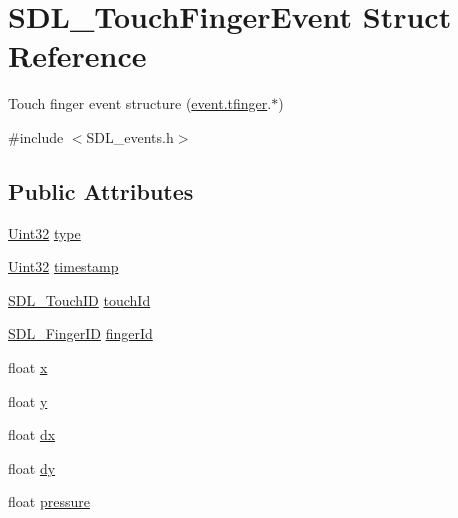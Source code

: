 \hypertarget{struct_s_d_l___touch_finger_event}{\section{S\-D\-L\-\_\-\-Touch\-Finger\-Event Struct Reference}
\label{struct_s_d_l___touch_finger_event}
}


Touch finger event structure (\hyperlink{union_s_d_l___event_ab18d7d60794cb056948ffa58541bc3c5}{event.\-tfinger}.$\ast$)  




{\ttfamily \#include $<$S\-D\-L\-\_\-events.\-h$>$}

\subsection*{Public Attributes}
\begin{DoxyCompactItemize}
\item 
\hyperlink{_s_d_l__stdinc_8h_add440eff171ea5f55cb00c4a9ab8672d}{Uint32} \hyperlink{struct_s_d_l___touch_finger_event_a3883218fa3426065ca66086c100edbfa}{type}
\item 
\hyperlink{_s_d_l__stdinc_8h_add440eff171ea5f55cb00c4a9ab8672d}{Uint32} \hyperlink{struct_s_d_l___touch_finger_event_abde2ab5cb013bbd21e37a65e2f8fa666}{timestamp}
\item 
\hyperlink{_s_d_l__touch_8h_a10f5f86abe4ea8308a8706bd5d3b337a}{S\-D\-L\-\_\-\-Touch\-I\-D} \hyperlink{struct_s_d_l___touch_finger_event_ad7a6f39ec9af1bf47b160d18314edd70}{touch\-Id}
\item 
\hyperlink{_s_d_l__touch_8h_a5fa58141f78415ca09645af359ad2250}{S\-D\-L\-\_\-\-Finger\-I\-D} \hyperlink{struct_s_d_l___touch_finger_event_a8616d46ed19906e3ee90a4d481d3a284}{finger\-Id}
\item 
float \hyperlink{struct_s_d_l___touch_finger_event_a0ce44b1342220fa17e9b9b4a77c2c906}{x}
\item 
float \hyperlink{struct_s_d_l___touch_finger_event_ac2bb8af638d2927a8e13f6ffe8f9384e}{y}
\item 
float \hyperlink{struct_s_d_l___touch_finger_event_ac6acac209d6e2bd659fdb6760081393d}{dx}
\item 
float \hyperlink{struct_s_d_l___touch_finger_event_a9c0320c5f18a6b9d10da657e166608c9}{dy}
\item 
float \hyperlink{struct_s_d_l___touch_finger_event_ab4fca822d0807b5748dbae8d3cc56524}{pressure}
\end{DoxyCompactItemize}


